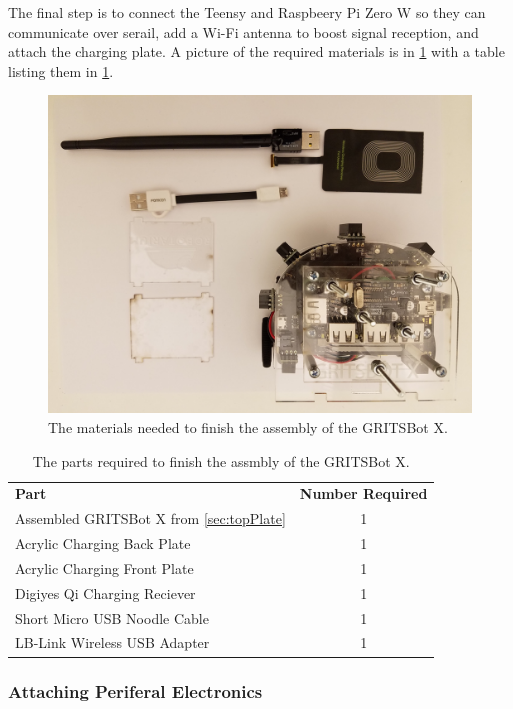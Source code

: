The final step is to connect the Teensy and Raspbeery Pi Zero W so they can communicate over serail, add a Wi-Fi antenna to boost signal reception, and attach the charging plate. A picture of the required materials is in \cref{fig:finalMaterials} with a table listing them in \cref{tab:finalMaterials}.

\begin{figure}[h!]
\centering
\includegraphics[width=0.65\columnwidth, keepaspectratio]{./figs/20190110_132826.jpg}
\caption{The materials needed to finish the assembly of the GRITSBot X.}
\label{fig:finalMaterials}
\end{figure}

 \begin{table}[h!]
 \centering
\begin{tabular}{p{3in}c}
\rowcolor[HTML]{C0C0C0} 
\textbf{Part}  & \textbf{Number Required} 		\\
Assembled GRITSBot X from \cref{sec:topPlate}		& 1	\\
\rowcolor[HTML]{C0C0C0} 
Acrylic Charging Back Plate			& 1	\\
Acrylic Charging Front Plate		& 1	\\
\rowcolor[HTML]{C0C0C0} 
Digiyes Qi Charging Reciever	& 1 \\
Short Micro USB Noodle Cable				& 1 \\
\rowcolor[HTML]{C0C0C0} 
LB-Link Wireless USB Adapter	& 1  \\
\end{tabular}
\caption{The parts required to finish the assmbly of the GRITSBot X. \label{tab:finalMaterials}}
\end{table}

\subsubsection{Attaching Periferal Electronics}
\label{sec:plugIn}

